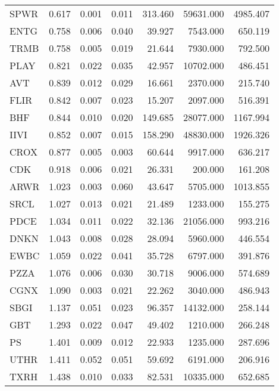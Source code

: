 \begin{table}
\begin{tabular}{lrrrrrr}
SPWR   &       0.617 &     0.001 &    0.011 & 313.460 & 59631.000 & 4985.407 \\
ENTG   &       0.758 &     0.006 &    0.040 &  39.927 &  7543.000 &  650.119 \\
TRMB   &       0.758 &     0.005 &    0.019 &  21.644 &  7930.000 &  792.500 \\
PLAY   &       0.821 &     0.022 &    0.035 &  42.957 & 10702.000 &  486.451 \\
AVT    &       0.839 &     0.012 &    0.029 &  16.661 &  2370.000 &  215.740 \\
FLIR   &       0.842 &     0.007 &    0.023 &  15.207 &  2097.000 &  516.391 \\
BHF    &       0.844 &     0.010 &    0.020 & 149.685 & 28077.000 & 1167.994 \\
IIVI   &       0.852 &     0.007 &    0.015 & 158.290 & 48830.000 & 1926.326 \\
CROX   &       0.877 &     0.005 &    0.003 &  60.644 &  9917.000 &  636.217 \\
CDK    &       0.918 &     0.006 &    0.021 &  26.331 &   200.000 &  161.208 \\
ARWR   &       1.023 &     0.003 &    0.060 &  43.647 &  5705.000 & 1013.855 \\
SRCL   &       1.027 &     0.013 &    0.021 &  21.489 &  1233.000 &  155.275 \\
PDCE   &       1.034 &     0.011 &    0.022 &  32.136 & 21056.000 &  993.216 \\
DNKN   &       1.043 &     0.008 &    0.028 &  28.094 &  5960.000 &  446.554 \\
EWBC   &       1.059 &     0.022 &    0.041 &  35.728 &  6797.000 &  391.876 \\
PZZA   &       1.076 &     0.006 &    0.030 &  30.718 &  9006.000 &  574.689 \\
CGNX   &       1.090 &     0.003 &    0.021 &  22.262 &  3040.000 &  486.943 \\
SBGI   &       1.137 &     0.051 &    0.023 &  96.357 & 14132.000 &  258.144 \\
GBT    &       1.293 &     0.022 &    0.047 &  49.402 &  1210.000 &  266.248 \\
PS     &       1.401 &     0.009 &    0.012 &  22.933 &  1235.000 &  287.696 \\
UTHR   &       1.411 &     0.052 &    0.051 &  59.692 &  6191.000 &  206.916 \\
TXRH   &       1.438 &     0.010 &    0.033 &  82.531 & 10335.000 &  652.685 \\

\end{tabular}
\end{table}
